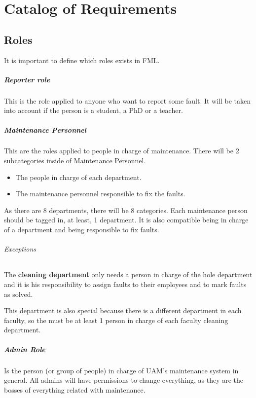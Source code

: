 \chapter{Catalog of Requirements}

\section{Roles}
It is important to define which roles exists in FML.

\paragraph{Reporter role} \label{ReporterRole} This is the role applied to anyone who want to report some fault. It will be taken into account if the person is a student, a PhD or a teacher. 

\paragraph{Maintenance Personnel} \label{MaintenancePersonnel}

This are the roles applied to people in charge of maintenance. There will be 2 subcategories inside of Maintenance Personnel. 

\begin{itemize}
\item The people in charge of each department.
\item The maintenance personnel responsible to fix the faults.
\end{itemize}

As there are 8 departments, there will be 8 categories. Each maintenance person should be tagged in, at least, 1 department. It is also compatible being in charge of a department and being responsible to fix faults.

\subparagraph{Exceptions} The \textbf{cleaning department} only needs a person in charge of the hole department and it is his responsibility to assign faults to their employees and to mark faults as solved. 

This department is also special because there is a different department in each faculty, so the must be at least 1 person in charge of each faculty cleaning department.

\paragraph{Admin Role} Is the person (or group of people) in charge of UAM's maintenance system in general. All admins will have permissions to change everything, as they are the bosses of everything related with maintenance.


